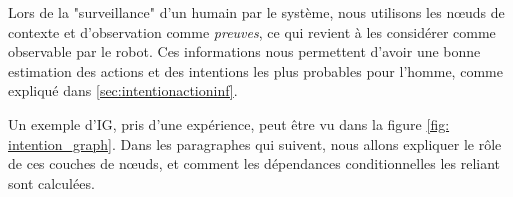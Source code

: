 \documentclass[a4paper,11pt,twoside]{StyleThese}
\begin{document}

Lors de la "surveillance" d'un humain par le système, nous utilisons les nœuds de contexte et d'observation comme \textit{preuves}, ce qui revient à les considérer comme observable par le robot. Ces informations nous permettent d'avoir une bonne estimation des actions et des intentions les plus probables pour l'homme, comme expliqué dans \ref{sec:intentionactioninf}.

Un exemple d'IG, pris d'une expérience, peut être vu dans la figure \ref{fig: intention_graph}. Dans les paragraphes qui suivent, nous allons expliquer le rôle de ces couches de nœuds, et comment les dépendances conditionnelles les reliant sont calculées.



\vspace{-10pt}
\end{document}
